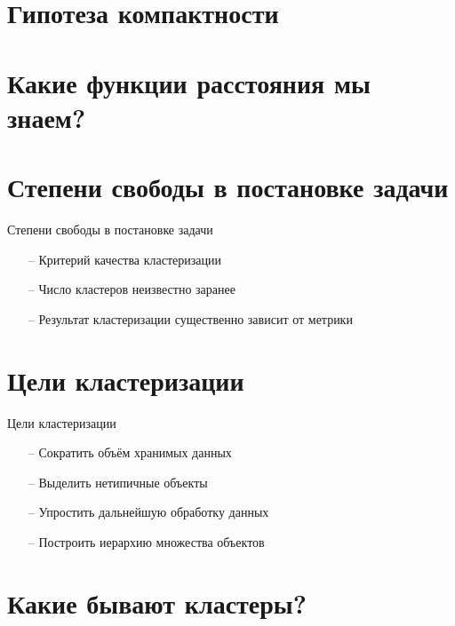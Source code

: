 \documentclass[10pt]{beamer}
\begin{document}
\section{Гипотеза компактности}

\section{Какие функции расстояния мы знаем?}

\section{Степени свободы в постановке задачи}

\begin{frame}{Степени свободы в постановке задачи}
	\begin{itemize} [<+- | alert@+>]
		\item[--] Критерий качества кластеризации
		\item[--] Число кластеров неизвестно заранее
		\item[--] Результат кластеризации существенно зависит от метрики
	\end{itemize}
\end{frame}

\section{Цели кластеризации}

\begin{frame}{Цели кластеризации}
	\begin{itemize} [<+- | alert@+>]
		\item[--] Сократить объём хранимых данных
		\item[--] Выделить нетипичные объекты
		\item[--] Упростить дальнейшую обработку данных
		\item[--] Построить иерархию множества объектов				
	\end{itemize}
\end{frame}

\section{Какие бывают кластеры?}
\end{document}
